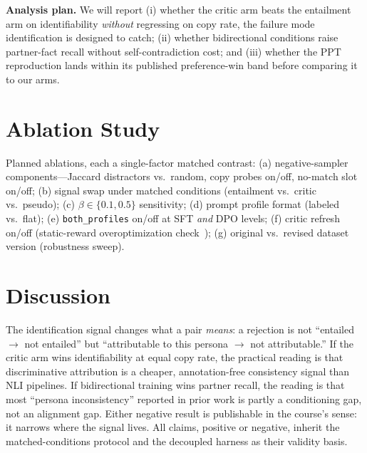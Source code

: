 \documentclass[lettersize,journal]{IEEEtran}
\begin{document}
\textbf{Analysis plan.} We will report (i) whether the critic arm beats the
entailment arm on identifiability \emph{without} regressing on copy rate, the
failure mode identification is designed to catch; (ii) whether bidirectional
conditions raise partner-fact recall without self-contradiction cost; and
(iii) whether the PPT reproduction lands within its published preference-win
band before comparing it to our arms.

\section{Ablation Study}
\label{sec:ablation}
Planned ablations, each a single-factor matched contrast: (a) negative-sampler
components---Jaccard distractors vs.\ random, copy probes on/off, no-match slot
on/off; (b) signal swap under matched conditions (entailment vs.\ critic vs.\
pseudo); (c) $\beta\in\{0.1,0.5\}$ sensitivity; (d) prompt profile format
(labeled vs.\ flat); (e) \texttt{both\_profiles} on/off at SFT \emph{and} DPO
levels; (f) critic refresh on/off (static-reward overoptimization
check~\cite{gao2023overopt}); (g) original vs.\ revised dataset version
(robustness sweep).

\section{Discussion}
\label{sec:discussion}
The identification signal changes what a pair \emph{means}: a rejection is not
``entailed $\rightarrow$ not entailed'' but ``attributable to this persona
$\rightarrow$ not attributable.'' If the critic arm wins identifiability at
equal copy rate, the practical reading is that discriminative attribution is a
cheaper, annotation-free consistency signal than NLI pipelines. If bidirectional
training wins partner recall, the reading is that most ``persona inconsistency''
reported in prior work is partly a conditioning gap, not an alignment gap. Either
negative result is publishable in the course's sense: it narrows where the
signal lives. All claims, positive or negative, inherit the matched-conditions
protocol and the decoupled harness as their validity basis.
\end{document}

